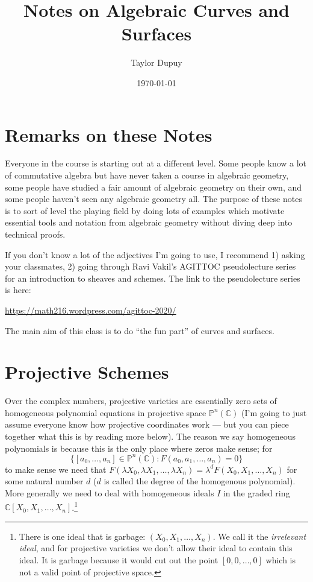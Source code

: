 \documentclass[12pt]{article}
\title{Notes on Algebraic Curves and Surfaces}
\date{\today}
\author{Taylor Dupuy}
\numberwithin{equation}{section}
\theoremstyle{definition}
\theoremstyle{remark}
\newcommand{\CC}{\mathbb{C}}
\newcommand{\PP}{\mathbb{P}}
\begin{document}
\maketitle

\tableofcontents

\section{Remarks on these Notes}
Everyone in the course is starting out at a different level. 
Some people know a lot of commutative algebra but have never taken a course in algebraic geometry, some people have studied a fair amount of algebraic geometry on their own, and some people haven't seen any algebraic geometry all. 
The purpose of these notes is to sort of level the playing field by doing lots of examples which motivate essential tools and notation from algebraic geometry without diving deep into technical proofs. 

If you don't know a lot of the adjectives I'm going to use, I recommend 1) asking your classmates, 2) going through Ravi Vakil's AGITTOC pseudolecture series for an introduction to sheaves and schemes. The link to the pseudolecture series is here:
\begin{center}
\url{https://math216.wordpress.com/agittoc-2020/}
\end{center}
The main aim of this class is to do ``the fun part'' of curves and surfaces.

\section{Projective Schemes}
Over the complex numbers, projective varieties are essentially zero sets of homogeneous polynomial equations in projective space $\PP^n(\CC)$ (I'm going to just assume everyone know how projective coordinates work --- but you can piece together what this is by reading more below). 
The reason we say homogeneous polynomials is because this is the only place where zeros make sense; for 
$$\lbrace [a_0,\ldots,a_n] \in \PP^n(\CC) \colon F(a_0,a_1,\ldots,a_n)=0 \rbrace $$
to make sense we need that $F(\lambda X_0,\lambda X_1,\ldots, \lambda X_n)= \lambda^d F(X_0,X_1,\ldots,X_n)$ for some natural number $d$ ($d$ is called the degree of the homogenous polynomial). 
More generally we need to deal with homogeneous ideals $I$ in the graded ring $\CC[X_0,X_1,\ldots,X_n]$.\footnote{There is one ideal that is garbage: $( X_0,X_1,\ldots, X_n) $. 
We call it the \emph{irrelevant ideal}, and for projective varieties we don't allow their ideal to contain this ideal. It is garbage because it would cut out the point $[0,0,\ldots,0]$ which is not a valid point of projective space.}
\end{document}
